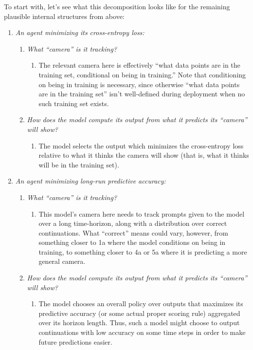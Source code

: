 \documentclass[
  twocolumn,
  natbib,
]{miri-tech-article}
\begin{document}
To start with, let's see what this decomposition looks like for the remaining plausible internal structures from above:



\begin{enumerate}
\item \textit{An agent minimizing its cross-entropy loss:}
    \begin{enumerate}
    \item \textit{What ``camera'' is it tracking?}
        \begin{enumerate}
        \item The relevant camera here is effectively ``what data points are in the training set, conditional on being in training.'' Note that conditioning on being in training is necessary, since otherwise ``what data points are in the training set'' isn't well-defined during deployment when no such training set exists.
        \end{enumerate}
    \item \textit{How does the model compute its output from what it predicts its ``camera'' will show?}
        \begin{enumerate}
        \item The model selects the output which minimizes the cross-entropy loss relative to what it thinks the camera will show (that is, what it thinks will be in the training set).
        \end{enumerate}
    \end{enumerate}
\item \textit{An agent minimizing long-run predictive accuracy:}
    \begin{enumerate}
    \item \textit{What ``camera'' is it tracking?}
        \begin{enumerate}
        \item This model's camera here needs to track prompts given to the model over a long time-horizon, along with a distribution over correct continuations. What “correct” means could vary, however, from something closer to 1a where the model conditions on being in training, to something closer to 4a or 5a where it is predicting a more general camera.
        \end{enumerate}
    \item \textit{How does the model compute its output from what it predicts its ``camera'' will show?}
        \begin{enumerate}
        \item The model chooses an overall policy over outputs that maximizes its predictive accuracy (or some actual proper scoring rule) aggregated over its horizon length. Thus, such a model might choose to output continuations with low accuracy on some time steps in order to make future predictions easier.

\end{enumerate}
\end{enumerate}
\end{enumerate}
\end{document}
